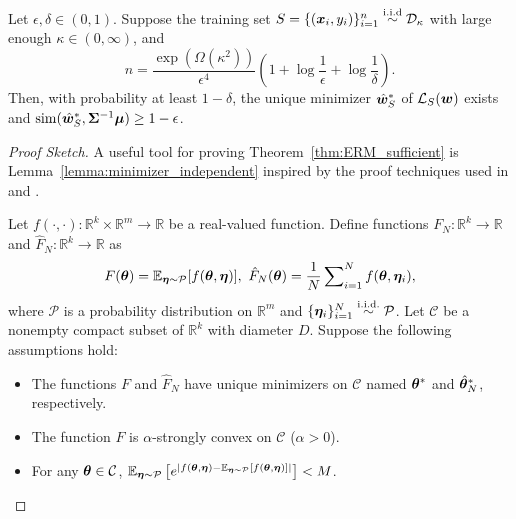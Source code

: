 \begin{theorem}\label{thm:ERM_sufficient}
Let $\epsilon, \delta \in (0,1)$. Suppose the training set $S = \{({\bm{x}}_i, y_i)\}_{i=1}^n\overset{\mathrm{i.i.d}}{\sim} \mathcal{D}_\kappa$ with large enough $\kappa \in (0,\infty)$, and
\begin{equation*}
n = \frac{\exp(\Omega(\kappa^2)) }{\epsilon^4} \left (1+ \log \frac{1}{\epsilon} + \log \frac{1}{\delta} \right ).
\end{equation*}
Then, with probability at least $1-\delta$, the unique minimizer $\hat{{\bm{w}}}_S^*$ of $\mathcal{L}_S({\bm{w}})$ exists and  $\mathrm{sim} (\hat{{\bm{w}}}_S^*, {\bm{\Sigma}}^{-1}{\bm{\mu}}) \geq 1- \epsilon$.
\end{theorem}
\vspace*{-10pt}
\begin{proof}[Proof Sketch]
A useful tool for proving Theorem~\ref{thm:ERM_sufficient} is Lemma~\ref{lemma:minimizer_independent} inspired by the proof techniques used in \citet{dai2000convergence} and \citet{shapiro2008stochastic}.
\begin{lemma}\label{lemma:minimizer_independent}
Let $f(\cdot, \cdot) : \mathbb{R}^k \times \mathbb{R}^m \rightarrow \mathbb{R}$ be a real-valued function. Define functions $F_N :  \mathbb{R}^k \rightarrow \mathbb{R}$ and $\hat{F}_N : \mathbb{R}^k \rightarrow \mathbb{R}$ as
\vspace*{-5pt}
\begin{equation*}
    F ({\bm{\theta}}) = \mathbb{E}_{{\bm{\eta}} \sim \mathcal{P}}[f({\bm{\theta}}, {\bm{\eta}})], 
    ~\hat{F}_N  ({\bm{\theta}}) = \frac{1}{N} \sum\nolimits_{i=1}^N f({\bm{\theta}}, {\bm{\eta}}_i),
\end{equation*}
where $\mathcal{P}$ is a probability distribution on $\mathbb{R}^m$ and $\{{\bm{\eta}}_i\}_{i=1}^N \overset{\mathrm{i.i.d.}}{\sim} \mathcal{P}$. Let $\mathcal{C}$ be a nonempty compact subset of $\mathbb{R}^k$ with diameter $D$. Suppose the following assumptions hold:
\vspace*{-5pt}
\begin{itemize}[leftmargin=3.5mm]
\item The functions $F$ and $\hat{F}_N$ have unique minimizers on $\mathcal{C}$ named ${\bm{\theta}}^*$ and $\hat{{\bm{\theta}}}_N^*$, respectively.
\item The function $F$ is $\alpha$-strongly convex on $\mathcal{C}$ ($\alpha>0$).
\item For any ${\bm{\theta}} \in \mathcal{C}$, $\mathbb{E}_{{\bm{\eta}} \sim \mathcal{P}}\left [e^{|f({\bm{\theta}}, {\bm{\eta}})- \mathbb{E}_{{\bm{\eta}} \sim \mathcal{P}}[f({\bm{\theta}}, {\bm{\eta}})] |} \right]<M$.

\end{itemize}
\end{lemma}
\end{proof}
